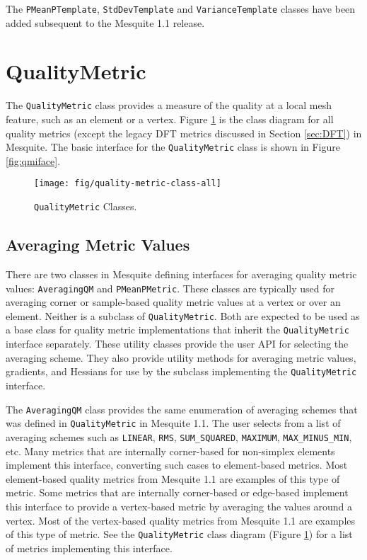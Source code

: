 \documentclass{article}
\begin{document}
The \texttt{PMeanPTemplate}, \texttt{StdDevTemplate} and \texttt{VarianceTemplate} classes have been added subsequent to the Mesquite 1.1 release.


\section{QualityMetric}

The \texttt{QualityMetric} class provides a measure of the quality at a local mesh feature, such as an element or a vertex.  Figure \ref{fig:qmclass} is the class diagram for all quality metrics (except the legacy DFT metrics discussed in Section \ref{sec:DFT}) in Mesquite.  The basic interface for the \texttt{QualityMetric} class is shown in Figure \ref{fig:qmiface}. 


\begin{figure}[p]
\begin{smallmargins}
\texttt{[image: fig/quality-metric-class-all]}
\caption{\texttt{QualityMetric} Classes.\label{fig:qmclass}}
\end{smallmargins}
\end{figure}


\subsection{Averaging Metric Values}

\label{sec:qmaverage}

There are two classes in Mesquite defining interfaces for averaging quality metric values: \texttt{AveragingQM} and \texttt{PMeanPMetric}.  These classes are typically used for averaging corner or sample-based quality metric values at a vertex or over an element.  Neither is a subclass of \texttt{QualityMetric}.  Both are expected to be used as a base class for quality metric implementations that inherit the \texttt{QualityMetric} interface separately.  These utility classes provide the user API for selecting the averaging scheme.  They also provide utility methods for averaging metric values, gradients, and Hessians for use by the subclass implementing the \texttt{QualityMetric} interface.

The \texttt{AveragingQM} class provides the same enumeration of averaging schemes that was defined in \texttt{QualityMetric} in Mesquite 1.1.  The user selects from a list of averaging schemes such as \texttt{LINEAR}, \texttt{RMS}, \texttt{SUM\_SQUARED}, \texttt{MAXIMUM}, \texttt{MAX\_MINUS\_MIN}, etc.  Many metrics that are internally corner-based for non-simplex elements implement this interface, converting such cases to element-based metrics.  Most element-based quality metrics from Mesquite 1.1 are examples of this type of metric.  Some metrics that are internally corner-based or edge-based implement this interface to provide a vertex-based metric by averaging the values around a vertex.  Most of the vertex-based quality metrics from Mesquite 1.1 are examples of this type of metric.  See the \texttt{QualityMetric} class diagram (Figure \ref{fig:qmclass}) for a list of metrics implementing this interface.
\end{document}
